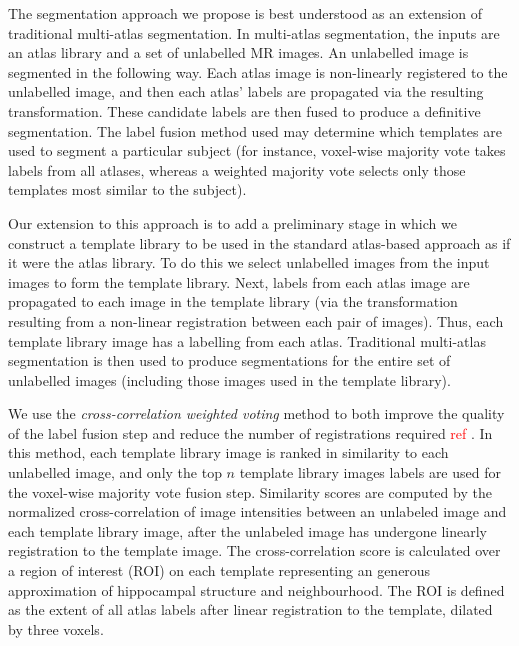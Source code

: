 \documentclass{article}
\newcommand{\todo}[1]{
    \textcolor{red}{#1}
}
\begin{document}
The segmentation approach we propose is best understood as an extension of
traditional multi-atlas segmentation.  In multi-atlas segmentation, the inputs
are an atlas library and a set of unlabelled MR images.  An unlabelled image is
segmented in the following way.  Each atlas image is non-linearly registered to
the unlabelled image, and then each atlas' labels are propagated via the
resulting transformation.  These candidate labels are then fused to produce a
definitive segmentation. The label fusion method used may determine which
templates are used to segment a particular subject (for instance, voxel-wise
majority vote takes labels from all atlases, whereas a weighted majority vote
selects only those templates most similar to the subject). 

Our extension to this approach is to add a preliminary stage in which we
construct a template library to be used in the standard atlas-based approach as
if it were the atlas library.  To do this we select unlabelled images from the
input images to form the template library.  Next, labels from each atlas image
are propagated to each image in the template library (via the transformation
resulting from a non-linear registration between each pair of images).
Thus, each template library image has a labelling from each atlas.  Traditional
multi-atlas segmentation is then used to produce segmentations for the entire
set of unlabelled images (including those images used in the template library). 
 
We use the {\it cross-correlation weighted voting} method to both improve the
quality of the label fusion step and reduce the number of registrations
required \todo{ref}.  In this method, each template library image is ranked 
in similarity to each unlabelled image, and only the top $n$ template library
images labels are used for the voxel-wise majority vote fusion step.
Similarity scores are computed by the normalized cross-correlation of image
intensities between an unlabeled image and each template library image, after
the unlabeled image has undergone linearly registration to the template image.
The cross-correlation score is calculated over a region of interest (ROI) on
each template representing an generous approximation of hippocampal structure
and neighbourhood.  The ROI is defined as the extent of all atlas labels after
linear registration to the template, dilated by three voxels.
\end{document}
